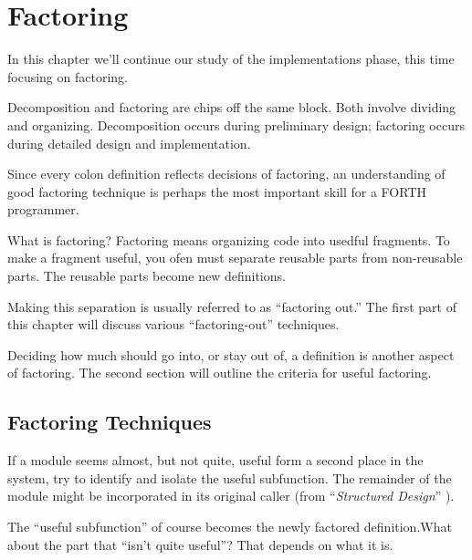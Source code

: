 




\chapter{Factoring}

In this chapter we'll continue our study of the implementations phase, this time focusing on factoring.

Decomposition and factoring are chips off the same block. Both involve dividing and organizing. Decomposition occurs during preliminary design; factoring occurs during detailed design and implementation.

Since every colon definition reflects decisions of factoring, an understanding of good factoring technique is perhaps the most important skill for a FORTH programmer.

What is factoring? Factoring means organizing code into usedful fragments. To make a fragment useful, you ofen must separate reusable parts from non-reusable parts. The reusable parts become new definitions.

Making this separation is usually referred to as ``factoring out.'' The first part of this chapter will discuss various ``factoring-out'' techniques.

Deciding how much should go into, or stay out of, a definition is another aspect of factoring. The second section will outline the criteria for useful factoring.

\section{Factoring Techniques}

\begin{tfquot}
If a module seems almost, but not quite, useful form a second place in the system, try to identify and isolate the useful subfunction. The remainder of the module might be incorporated in its original caller (from ``\emph{Structured Design}'' \cite{stevens74-6}).
\end{tfquot}
The ``useful subfunction'' of course becomes the newly factored definition.What about the part that ``isn't quite useful''? That depends on what it is.

